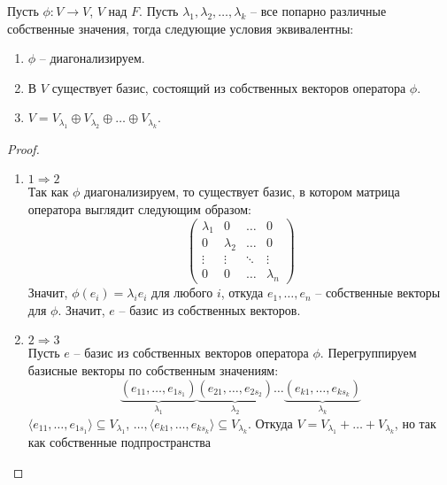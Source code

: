 \begin{theorem}
    \label{theorem4.1}
    Пусть $\phi: V \to V$, $V$ над $F$. Пусть $\lambda_1, \lambda_2, \dots, \lambda_k$ -- все 
    попарно различные собственные значения, тогда следующие условия эквивалентны:
    \begin{enumerate}
        \item $\phi$ -- диагонализируем.
        \item В $V$ существует базис, состоящий из собственных векторов оператора $\phi$.
        \item $V = V_{\lambda_1} \oplus V_{\lambda_2} \oplus \dots \oplus V_{\lambda_k}$.
    \end{enumerate}
\end{theorem}

\begin{proof}~
    \begin{enumerate}
        \item $1 \Rightarrow 2$ \\
        Так как $\phi$ диагонализируем, то существует базис, в котором матрица оператора выглядит 
        следующим образом:
        \begin{equation*}
        \left(
            \begin{array}{cccc}
            \lambda_{1} & 0 & \ldots & 0\\
            0 & \lambda_{2} & \ldots & 0\\
            \vdots & \vdots & \ddots & \vdots\\
            0 & 0 & \ldots & \lambda_n
            \end{array}
        \right)
        \end{equation*}
        Значит, $\phi(e_i) = \lambda_i e_i$ для любого $i$, откуда $e_1, \dots, e_n$ -- собственные 
        векторы для $\phi$. Значит, $e$ -- базис из собственных векторов.
        \item $2 \Rightarrow 3$ \\
        Пусть $e$ -- базис из собственных векторов оператора $\phi$. Перегруппируем базисные векторы 
        по собственным значениям: 
        $$\underbrace{(e_{11}, \dots, e_{1s_1})}_{\lambda_1} \underbrace{(e_{21}, \dots, e_{2s_2})}_{\lambda_2} 
        \dots \underbrace{(e_{k1}, \dots, e_{ks_k})}_{\lambda_k}$$
        $\langle e_{11}, \dots, e_{1s_1} \rangle \subseteq V_{\lambda_1}$, 
        $\dots, \langle e_{k1}, \dots, e_{ks_k} \rangle \subseteq V_{\lambda_k}$. 
        Откуда $V = V_{\lambda_1} + \dots + V_{\lambda_k}$, но так как собственные подпространства 

\end{enumerate}
\end{proof}
